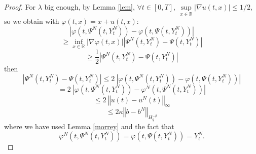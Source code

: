 \documentclass[11pt]{enstaPRE}
\newcommand{\norme}[1]{\left\Vert #1\right\Vert}
\newcommand{\R}{\mathbb{R}}
\begin{document}
\begin{proof}
    For $\lambda$ big enough, by Lemma \ref{lem}, $\forall t \in[0,T],\ \underset{x\in\R}{\sup}\left|\nabla u(t,x)\right| \leq 1/2$, so we obtain with $\varphi(t,x)=x+u(t,x)$:
    \begin{equation*}
    \left|\varphi\left(t,\Psi^N\left(t,Y_t^N\right)\right)-\varphi\left(t,\Psi\left(t,Y_t^N\right)\right)\right| 
    \end{equation*}
    \begin{equation*}
    \geq \underset{x\in\R}{\inf}\left|\nabla\varphi(t,x)\right|
    \left|\Psi^N\left(t,Y_t^N\right)-\Psi\left(t,Y_t^N\right)\right|
    \end{equation*}
    \begin{equation*}
    \geq \frac{1}{2} \left|\Psi^N\left(t,Y_t^N\right)-\Psi\left(t,Y_t^N\right)\right|
    \end{equation*}    
    then
    \begin{equation*}
    \left|\Psi^N\left(t,Y_t^N\right)-\Psi\left(t,Y_t^N\right)\right|\leq 2\ \left|\varphi\left(t,\Psi^N\left(t,Y_t^N\right)\right)-\varphi\left(t,\Psi\left(t,Y_t^N\right)\right)\right|
    \end{equation*}   
    \begin{equation*}
    = 2\ \left|\varphi\left(t,\Psi^N\left(t,Y_t^N\right)\right)-\varphi^N\left(t,\Psi^N\left(t,Y_t^N\right)\right)\right|
    \end{equation*}   
    \begin{equation*}
    \leq 2\ \norme{u(t)-u^N(t)}_\infty
    \end{equation*} 
    \begin{equation}\label{other}
    \leq 2\kappa \norme{b-b^N}_{H^{-\beta}_q}
    \end{equation} 
    where we have used Lemma \ref{morrey} and the fact that \begin{equation}
    \varphi^N\left(t,\Psi^N\left(t,Y_t^N\right)\right)=\varphi\left(t,\Psi\left(t,Y_t^N\right)\right) = Y_t^N.
    \end{equation}
\end{proof}
\end{document}

